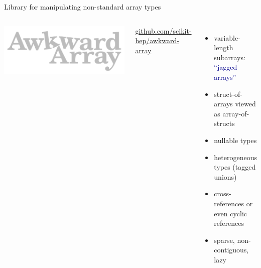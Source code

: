 \documentclass[aspectratio=169]{beamer}
\begin{document}
\begin{frame}{Library for manipulating non-standard array types}
\vspace{0.5 cm}
\begin{columns}
\includegraphics[width=\linewidth]{awkward-logo.pdf}

\vspace{0.25 cm}
\hfill \scriptsize \textcolor{darkblue}{\url{github.com/scikit-hep/awkward-array}}

\vspace{0.5 cm}
\vspace{2\baselineskip}
\begin{itemize}
\item variable-length subarrays: \textcolor{darkblue}{``jagged arrays''}
\item struct-of-arrays viewed as array-of-structs
\item nullable types
\item heterogeneous types (tagged unions)
\item cross-references or even cyclic references
\item sparse, non-contiguous, lazy
\end{itemize}

\vspace{0.5 cm}
\end{columns}
\end{frame}
\end{document}

